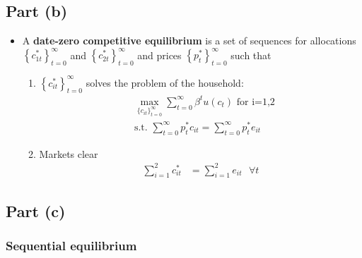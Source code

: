 \documentclass{scrartcl}
\begin{document}
\subsection*{Part (b)}

\begin{itemize}
	\item A \textbf{date-zero competitive equilibrium} is a set of sequences for allocations $\left\{c_{1t}^*\right\}_{t=0}^{\infty}$ and $\left\{c_{2t}^*\right\}_{t=0}^{\infty}$ and prices $\left\{p_{t}^*\right\}_{t=0}^{\infty}$ such that 
	
	\begin{enumerate}
		\item $\left\{c_{it}^*\right\}_{t=0}^{\infty}$ solves the problem of the household:
		\begin{align}
		&\max_{\{{c_{it}}\}_{t=0}^{\infty}} {\sum_{t=0}^{\infty} \beta^t u(c_t)} \text{ for i=1,2}\\
		&\text{s.t. } \sum_{t=0}^{\infty} p_{t}^* c_{it}=\sum_{t=0}^{\infty} p_{t}^* e_{it} \nonumber 
		\end{align}
		\item Markets clear
		\begin{align}
		\sum_{i=1}^{2} c^*_{it}&=\sum_{i=1}^{2} e_{it} \text{ } \forall t
		\end{align}
	\end{enumerate}

\end{itemize}

\subsection*{Part (c)}

\subsubsection*{Sequential equilibrium}
\end{document}
